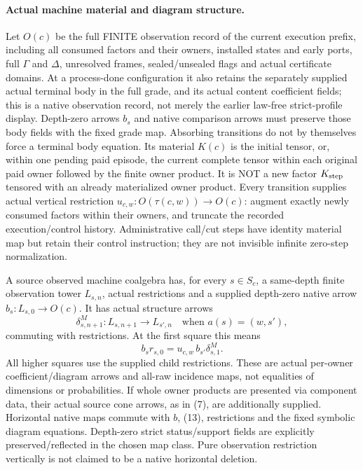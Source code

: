 \documentclass[11pt]{article}
\begin{document}
\paragraph{Actual machine material and diagram structure.}
Let $O(c)$ be the full FINITE observation record of the current execution prefix, including all consumed factors and their owners, installed states and early ports, full $\Gamma$ and $\Delta$, unresolved frames, sealed/unsealed flags and actual certificate domains. At a process-done configuration it also retains the separately supplied actual terminal body in the full grade, and its actual content coefficient fields; this is a native observation record, not merely the earlier law-free strict-profile display. Depth-zero arrows $b_s$ and native comparison arrows must preserve those body fields with the fixed grade map. Absorbing transitions do not by themselves force a terminal body equation. Its material $K(c)$ is the initial tensor, or, within one pending paid episode, the current complete tensor within each original paid owner followed by the finite owner product. It is NOT a new factor $K_{\rm step}$ tensored with an already materialized owner product. Every transition supplies actual vertical restriction $u_{c,w}:O(\tau(c,w))\to O(c)$: augment exactly newly consumed factors within their owners, and truncate the recorded execution/control history. Administrative call/cut steps have identity material map but retain their control instruction; they are not invisible infinite zero-step normalization.

A source observed machine coalgebra has, for every $s\in S_c$, a same-depth finite observation tower $L_{s,n}$, actual restrictions and a supplied depth-zero native arrow $b_s:L_{s,0}\to O(c)$. It has actual structure arrows
\[
 \delta^M_{s,n+1}:L_{s,n+1}\longrightarrow L_{s',n}
 \quad\text{when }a(s)=(w,s'),                            \tag{13}
\]
commuting with restrictions. At the first square this means
\[
 b_s r_{s,0}=u_{c,w}\,b_{s'}\delta^M_{s,1}.               \tag{14}
\]
All higher squares use the supplied child restrictions. These are actual per-owner coefficient/diagram arrows and all-raw incidence maps, not equalities of dimensions or probabilities. If whole owner products are presented via component data, their actual source cone arrows, as in (7), are additionally supplied. Horizontal native maps commute with $b$, (13), restrictions and the fixed symbolic diagram equations. Depth-zero strict status/support fields are explicitly preserved/reflected in the chosen map class. Pure observation restriction vertically is not claimed to be a native horizontal deletion.
\end{document}
